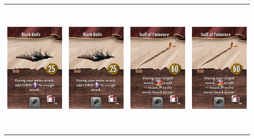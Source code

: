 \documentclass{minimal}
\begin{document}
{\begin{longtable}{llll}
\includegraphics[width=44mm,height=68mm]{./50-56/gh-053-black-knife.png} &
\includegraphics[width=44mm,height=68mm]{./50-56/gh-053-black-knife.png} &
\includegraphics[width=44mm,height=68mm]{./50-56/gh-054-staff-of-eminence.png} &
\includegraphics[width=44mm,height=68mm]{./50-56/gh-054-staff-of-eminence.png}\\ 

\end{longtable}}
\end{document}
